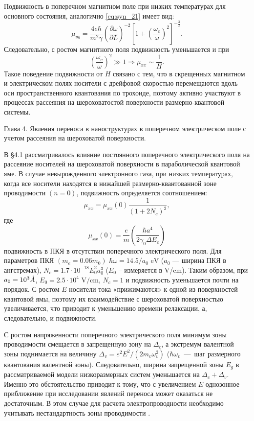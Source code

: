 Подвижность в поперечном магнитном поле при низких температурах для основного состояния, аналогично \eqref{eq:syn_21} имеет вид:
\begin{equation} \label{eq:syn_22}
\mu_{yy} =\frac{4e\hbar }{m^{2} \gamma } \left(\frac{\partial \omega }{\partial L} \right)^{-2} \left[1+\left(\frac{\omega _{c} }{\omega } \right)^{2} \right]^{-\frac{3}{2} }.
\end{equation}
Следовательно, с ростом магнитного поля подвижность уменьшается и при
\[
\left(\frac{\omega_c}{\omega } \right)^2 \gg 1 \Rightarrow \mu_{xx} \sim \frac{1}{H} .
\]
Такое поведение подвижности от $H$ связано с тем, что в скрещенных магнитном и электрическом полях носители с дрейфовой скоростью перемещаются вдоль оси пространственного квантования по трохоиде, поэтому активно участвуют в процессах рассеяния на шероховатостой поверхности размерно-квантовой системы. 

Глава 4. Явления переноса в наноструктурах в поперечном электрическом поле с учетом рассеяния на шероховатой поверхности.

В §4.1 рассматривалось влияние постоянного поперечного электрического поля на рассеяние носителей на шероховатой поверхности в параболической квантовой яме. В случае невырожденного электронного газа, при низких температурах, когда все носители находятся в нижайшей размерно-квантованной зоне проводимости $(n=0)$, подвижность определяется соотношением:
\begin{equation} \label{eq:syn_23}
\mu_{xx} =\mu_{xx}(0)\frac{1}{\left(1+2 N_c \right)^2 } ,
\end{equation}
где
\[
\mu_{xx}(0)=\frac{e}{m} \left(\frac{\hbar a^4 }{2\gamma_0 \Delta E_c } \right)
\]
подвижность в ПКЯ в отсутствии поперечного электрического поля.
Для параметров ПКЯ $(m_e = 0.06 m_0 )$ $\hbar \omega = 14.5/a_0 \text{ eV}$ ($a_0 $ --- ширина ПКЯ в ангстремах), $N_c =1.7\cdot 10^{-18} E_0^2 a_0^3 $ ($E_0 $ -- измеряется в V/cm). Таким образом, при $a_0 = 10^3 \AA$, $E_0 = 2.5\cdot 10^4 \text{ V/cm}$, $N_c =1$ и подвижность уменьшается почти на порядок. С ростом $E$ носители тока «прижимаются» к одной из поверхностей квантовой ямы, поэтому их взаимодействие с шероховатой поверхностью увеличивается, что приводит к уменьшению времени релаксации, а, следовательно, и подвижности.

С ростом напряженности поперечного электрического поля минимум зоны проводимости смещается в запрещенную зону на $\Delta_c $, а экстремум валентной зоны поднимается на величину $\Delta_v =e^2 E^2  / (2m_v  \omega_v^2 )$ ($\hbar \omega_v $~---~шаг размерного квантования валентной зоны). Следовательно, ширина запрещенной зоны $E_g$ в рассматриваемой модели низкоразмерных систем уменьшается на $\Delta_c +\Delta_v $. Именно это обстоятельство приводит к тому, что с увеличением $E$ однозонное приближение при исследовании явлений переноса может оказаться не достаточным. В этом случае для расчета электропроводности необходимо учитывать нестандартность зоны проводимости \cite{Lax1960,Cohen1961}.


